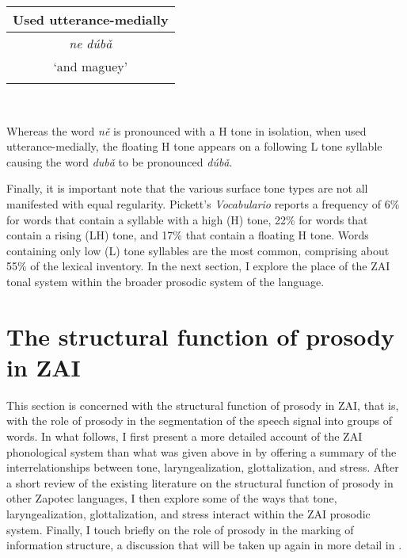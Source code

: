 \begin{table}

\begin{tabular}{ c }
\midrule
Used utterance-medially \\

\midrule
\textit{n{e}}  \textit{d\'{u}b\v{a}} \\
`and maguey' \\

\lspbottomrule
\end{tabular} \\

\end{table}

Whereas the word \textit{n\v{e}} is pronounced with a H tone in isolation, when used utterance-medially, the floating H tone appears on a following L tone syllable causing the word \textit{dub\v{a}} to be pronounced \textit{d\'{u}b\v{a}}.

Finally, it is important note that the various surface tone types are not all manifested with equal regularity. Pickett's \textit{Vocabulario} reports a frequency of 6\% for words that contain a syllable with a high (H) tone, 22\% for words that contain a rising (LH) tone, and 17\% that contain a floating H tone. Words containing only low (L) tone syllables are the most common, comprising about 55\% of the lexical inventory. In the next section, I explore the place of the ZAI tonal system within the broader prosodic system of the language.


\section{The structural function of prosody in ZAI}\label{prosody}

This section is concerned with the structural function of prosody in ZAI, that is, with the role of prosody in the segmentation of the speech signal into groups of words. In what follows, I first present a more detailed account of the ZAI phonological system than what was given above in  by offering a summary of the interrelationships between tone, laryngealization, glottalization, and stress. After a short review of the existing literature on the structural function of prosody in other Zapotec languages, I then explore some of the ways that tone, laryngealization, glottalization, and stress interact within the ZAI prosodic system. Finally, I touch briefly on the role of prosody in the marking of information structure, a discussion that will be taken up again in more detail in .


